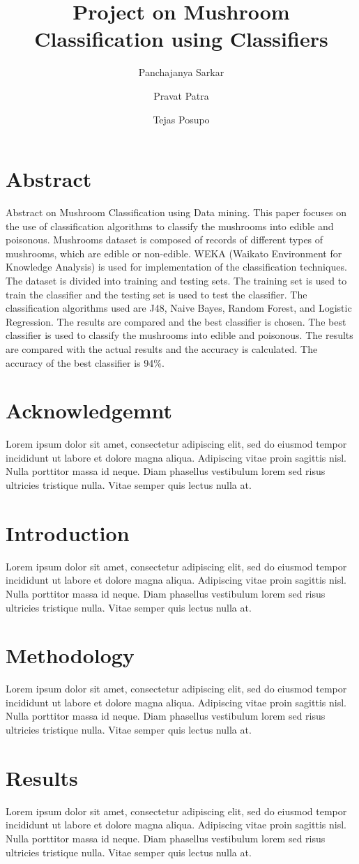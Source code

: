 \documentclass[a4paper,11pt]{article}
\title{Project on Mushroom Classification using Classifiers}
\author[a]{Panchajanya Sarkar}
\author[b]{Pravat Patra}
\author[c]{Tejas Posupo}
\affiliation[*]{Central University of Rajasthan,\\
  NH-8, Ajmer, 305817, India}
\begin{document}
    \maketitle
        \section{Abstract}
            Abstract on Mushroom Classification using Data mining.
            This paper focuses on the use of classification algorithms to classify the mushrooms into edible and poisonous. Mushrooms dataset is composed of records of different types of mushrooms, which are edible or non-edible. WEKA (Waikato Environment for Knowledge Analysis) is used for implementation of the classification techniques. The dataset is divided into training and testing sets. The training set is used to train the classifier and the testing set is used to test the classifier. The classification algorithms used are J48, Naive Bayes, Random Forest, and Logistic Regression. The results are compared and the best classifier is chosen. The best classifier is used to classify the mushrooms into edible and poisonous. The results are compared with the actual results and the accuracy is calculated. The accuracy of the best classifier is 94\%.
        \section{Acknowledgemnt}
            Lorem ipsum dolor sit amet, consectetur adipiscing elit, sed do eiusmod tempor incididunt ut labore et dolore magna aliqua. Adipiscing vitae proin sagittis nisl. Nulla porttitor massa id neque. Diam phasellus vestibulum lorem sed risus ultricies tristique nulla. Vitae semper quis lectus nulla at.
        \section{Introduction}
            Lorem ipsum dolor sit amet, consectetur adipiscing elit, sed do eiusmod tempor incididunt ut labore et dolore magna aliqua. Adipiscing vitae proin sagittis nisl. Nulla porttitor massa id neque. Diam phasellus vestibulum lorem sed risus ultricies tristique nulla. Vitae semper quis lectus nulla at.
        \section{Methodology}
            Lorem ipsum dolor sit amet, consectetur adipiscing elit, sed do eiusmod tempor incididunt ut labore et dolore magna aliqua. Adipiscing vitae proin sagittis nisl. Nulla porttitor massa id neque. Diam phasellus vestibulum lorem sed risus ultricies tristique nulla. Vitae semper quis lectus nulla at.
        \section{Results}
            Lorem ipsum dolor sit amet, consectetur adipiscing elit, sed do eiusmod tempor incididunt ut labore et dolore magna aliqua. Adipiscing vitae proin sagittis nisl. Nulla porttitor massa id neque. Diam phasellus vestibulum lorem sed risus ultricies tristique nulla. Vitae semper quis lectus nulla at.
            
\end{document}
